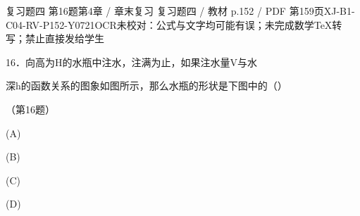 \begin{bankitem}{复习题四 第16题}{第4章 / 章末复习 复习题四 / 教材 p.152 / PDF 第159页}{XJ-B1-C04-RV-P152-Y0721}{OCR未校对：公式与文字均可能有误；未完成数学TeX转写；禁止直接发给学生}
\begin{ocrdraft}
\par
16．向高为H的水瓶中注水，注满为止，如果注水量V与水
\par
深h的函数关系的图象如图所示，那么水瓶的形状是下图中的（）
\par
（第16题）
\par
(A)
\par
(B)
\par
(C)
\par
(D)
\end{ocrdraft}
\end{bankitem}
